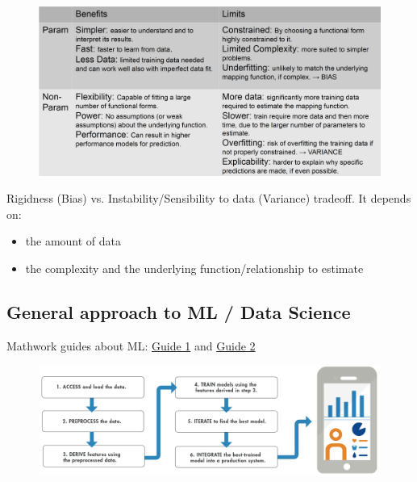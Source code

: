 \documentclass[a4paper]{article}
\begin{document}
			\begin{figure}[htb!]
				\centering
				\includegraphics[width=\textwidth]{img/sw09/pro_con.png}
			\end{figure}
		
			Rigidness (Bias) vs. Instability/Sensibility to data (Variance) tradeoff.
			It depends on:
			\begin{itemize}
				\item the amount of data
				\item the complexity and the underlying function/relationship to estimate
			\end{itemize}
		
		\subsection{General approach to ML / Data Science}
		
		Mathwork guides about ML: \href{https://ch.mathworks.com/content/dam/mathworks/tag-team/Objects/i/88655_93014v00_machine_learning_section2_ebook.pdf}{Guide 1} and
		\href{https://ch.mathworks.com/content/dam/mathworks/tag-team/Objects/i/90221_80827v00_machine_learning_section4_ebook_v03.pdf}{Guide 2}
		
		\begin{figure}[htb!]
			\centering
			\includegraphics[width=\textwidth]{img/sw09/ml_approach.png}
		\end{figure}
	
\end{document}
